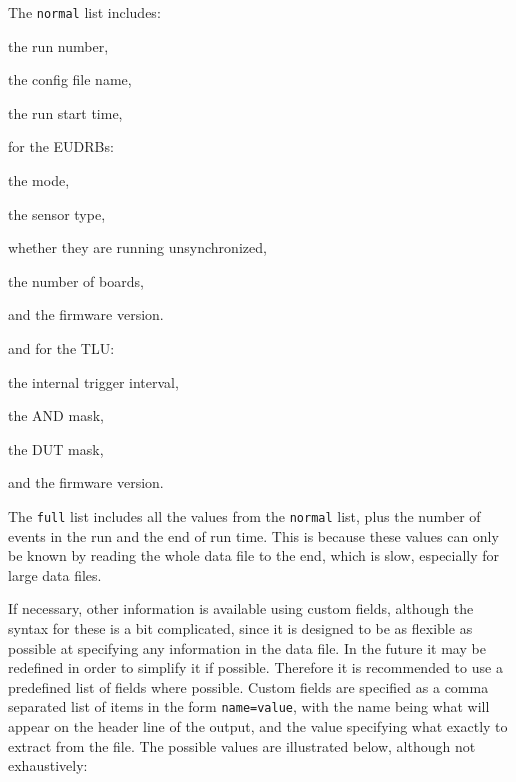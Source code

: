 The \texttt{normal} list includes:
\begin{myitemize}
  \item the run number,
  \item the config file name,
  \item the run start time,
  \item for the \glspl{EUDRB}:
  \begin{myitemize}
    \item the mode,
    \item the sensor type,
    \item whether they are running unsynchronized,
    \item the number of boards,
    \item and the firmware version.
  \end{myitemize}
  \item and for the \gls{TLU}:
    \begin{myitemize}
    \item the internal trigger interval,
    \item the AND mask,
    \item the DUT mask,
    \item and the firmware version.
  \end{myitemize}
\end{myitemize}

The \texttt{full} list includes all the values from the \texttt{normal} list,
plus the number of events in the run and the end of run time.
This is because these values can only be known by reading
the whole data file to the end, which is slow, especially for large data files.

If necessary, other information is available using custom fields,
although the syntax for these is a bit complicated,
since it is designed to be as flexible as possible at specifying any information in the data file.
In the future it may be redefined in order to simplify it if possible.
Therefore it is recommended to use a predefined list of fields where possible.
Custom fields are specified as a comma separated list of items in the form \texttt{name=value},
with the name being what will appear on the header line of the output,
and the value specifying what exactly to extract from the file.
The possible values are illustrated below, although not exhaustively:

